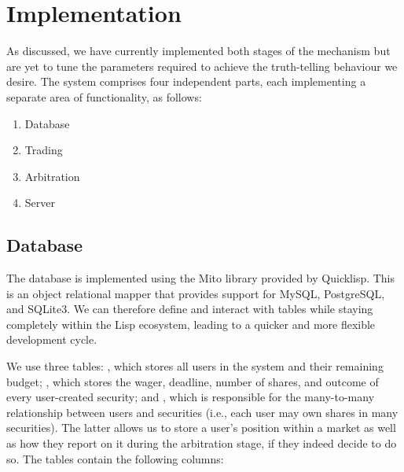 \section{Implementation}

\label{sec:implementation}

As discussed, we have currently implemented both stages of the mechanism but
are yet to tune the parameters required to achieve the truth-telling behaviour
we desire. The system comprises four independent parts, each implementing a
separate area of functionality, as follows:

\begin{enumerate}
	\itemsep0em
	\item Database
	\item Trading
	\item Arbitration
	\item Server
\end{enumerate}

\subsection{Database}

The database is implemented using the Mito library provided by Quicklisp. This
is an object relational mapper that provides support for MySQL, PostgreSQL, and
SQLite3. We can therefore define and interact with tables while staying
completely within the Lisp ecosystem, leading to a quicker and more flexible
development cycle.

We use three tables: , which stores all users in the system and
their remaining budget; , which stores the wager, deadline,
number of shares, and outcome of every user-created security; and
, which is responsible for the many-to-many relationship
between users and securities (i.e., each user may own shares in many
securities). The latter allows us to store a user's position within a market as
well as how they report on it during the arbitration stage, if they indeed
decide to do so. The tables contain the following columns:

